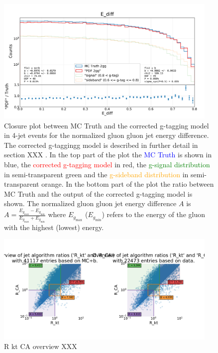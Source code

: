 \begin{figure}
  \includegraphics[width=0.95\textwidth, trim=0 0 0 65, clip, page=1]{figures/quarks/gtag-closure_test-down_sample=1.00-ML_vars=vertex-selection=b-ejet_min=4-n_iter_RS_lgb=99-n_iter_RS_xgb=9-cdot_cut=0.90-version=19-njet=3.pdf}
  \caption[Closure plot between MC Truth and the corrected g-tagging model in 4-jet events for the normalized gluon gluon jet energy difference]
          {Closure plot between MC Truth and the corrected g-tagging model in 4-jet events for the normalized gluon gluon jet energy difference. The corrected g-taggingg model is described in further detail in section XXX \TODO. In the top part of the plot the \textcolor{blue}{MC Truth} is shown in blue, the \textcolor{red}{corrected g-tagging model}  in red, the \textcolor{green}{g-signal distribution} in semi-transparent green and the \textcolor{orange}{g-sideband distribution} in semi-transparent orange. In the bottom part of the plot the ratio between MC Truth and the output of the corrected g-tagging model is shown. The normalized gluon gluon jet energy difference $A$ is $A=\frac{E_{g_\mathrm{max}}-E_{g_\mathrm{min}}}{E_{g_\mathrm{max}}+E_{g_\mathrm{min}}}$ where $E_{g_\mathrm{max}}$ ($E_{g_\mathrm{min}}$) refers to the energy of the gluon with the highest (lowest) energy.
          } 
  \label{fig:q:closure_E_diff}
\end{figure}


\begin{figure}
  \includegraphics[width=0.95\textwidth, trim=0 0 0 118, clip, page=1]{figures/quarks/gtag-R_kt_CA_overview-down_sample=1.00-ML_vars=vertex-selection=b-ejet_min=4-n_iter_RS_lgb=99-n_iter_RS_xgb=9-cdot_cut=0.90-version=19-njet=4}
  \caption[R kt CA overview  XXX \TODO]
          {R kt CA overview XXX \TODO
          } 
  \label{fig:q:R_kt_CA_overview}
\end{figure}

